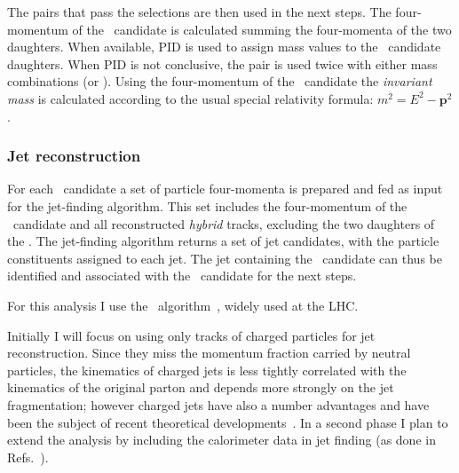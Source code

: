 \documentclass[a4paper]{jpconf}
\begin{document}
The pairs that pass the selections are then used in the next steps.
The four-momentum of the \Dzero\ candidate is calculated summing the four-momenta of the two daughters.
When available, PID is used to assign mass values to the \Dzero\ candidate daughters. When PID is not conclusive,
the pair is used twice with either mass combinations (\pip \kam or \pim \kap). Using the four-momentum of the \Dzero\ candidate
the \emph{invariant mass} is calculated according to the usual special relativity formula: $m^2 = E^2 - \bm{p}^2$.

\subsubsection{Jet reconstruction}
For each \Dzero\ candidate a set of particle four-momenta is prepared and fed as input for the jet-finding algorithm.
This set includes the four-momentum of the \Dzero\ candidate and all reconstructed \emph{hybrid} tracks,
excluding the two daughters of the \Dzero. The jet-finding algorithm returns a set of jet candidates, with the particle constituents
assigned to each jet. The jet containing the \Dzero\ candidate can thus be identified and associated with the \Dzero\ candidate for the next steps.

For this analysis I use the \antikt\ algorithm~\cite{Cacciari:2008c}, widely used at the LHC.

Initially I will focus on using only tracks of charged particles for jet reconstruction. Since they miss the momentum
fraction carried by neutral particles, the kinematics of charged jets is less tightly correlated with the kinematics
of the original parton and depends more strongly on the jet fragmentation; however charged jets have also a number advantages
and have been the subject of recent theoretical developments~\cite{Thaler:2013}.
In a second phase I plan to extend the analysis by including the calorimeter data in jet finding (as done in Refs.~\cite{ALICE:2013c, ALICE:2015a}).
\end{document}
